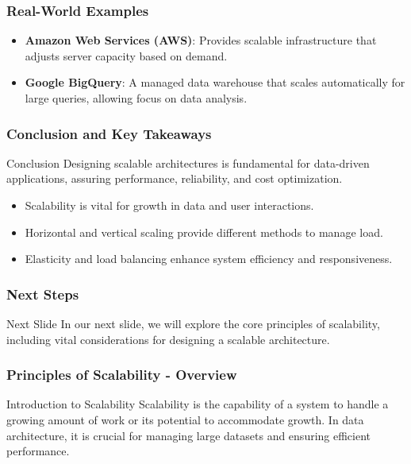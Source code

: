 \documentclass[aspectratio=169]{beamer}
\begin{document}
\begin{frame}[fragile]
    \frametitle{Real-World Examples}
    \begin{itemize}
        \item \textbf{Amazon Web Services (AWS)}: Provides scalable infrastructure that adjusts server capacity based on demand.
        \item \textbf{Google BigQuery}: A managed data warehouse that scales automatically for large queries, allowing focus on data analysis.
    \end{itemize}
\end{frame}

\begin{frame}[fragile]
    \frametitle{Conclusion and Key Takeaways}
    \begin{block}{Conclusion}
        Designing scalable architectures is fundamental for data-driven applications, assuring performance, reliability, and cost optimization.
    \end{block}
    \begin{itemize}
        \item Scalability is vital for growth in data and user interactions.
        \item Horizontal and vertical scaling provide different methods to manage load.
        \item Elasticity and load balancing enhance system efficiency and responsiveness.
    \end{itemize}
\end{frame}

\begin{frame}[fragile]
    \frametitle{Next Steps}
    \begin{block}{Next Slide}
        In our next slide, we will explore the core principles of scalability, including vital considerations for designing a scalable architecture.
    \end{block}
\end{frame}

\begin{frame}[fragile]
    \frametitle{Principles of Scalability - Overview}
    \begin{block}{Introduction to Scalability}
        Scalability is the capability of a system to handle a growing amount of work or its potential to accommodate growth. In data architecture, it is crucial for managing large datasets and ensuring efficient performance.
    \end{block}
\end{frame}
\end{document}

